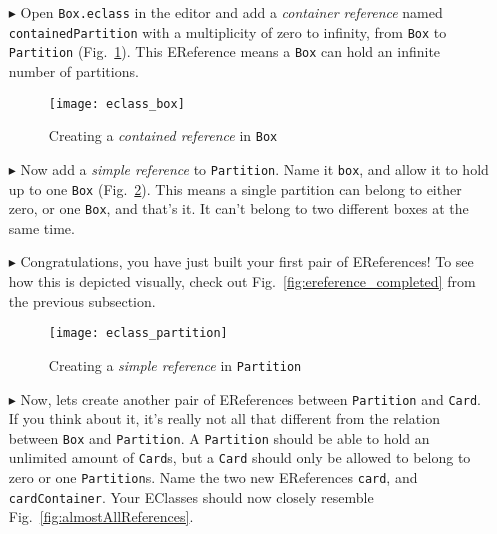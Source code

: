 \begin{itemize}

\item[$\blacktriangleright$] Open \texttt{Box.eclass} in the editor and add a \emph{container reference} named \texttt{containedPartition} with a
multiplicity of zero to infinity, from \texttt{Box} to \texttt{Partition} (Fig.~\ref{fig:cpartitionReference}). This EReference means a \texttt{Box}
can hold an infinite number of partitions.

\vspace{0.5cm}

\begin{figure}[htbp]
	\centering
  \texttt{[image: eclass\_box]}
	\caption{Creating a \emph{contained reference} in \texttt{Box}}
	\label{fig:cpartitionReference}
\end{figure} 

\vspace{0.5cm}

\item[$\blacktriangleright$] Now add a \emph{simple reference} to \texttt{Partition}. Name it \texttt{box}, and allow it to hold up to one \texttt{Box}
(Fig.~\ref{fig:boxReference}). This means a single partition can belong to either zero, or one \texttt{Box}, and that's it. It can't belong to two different
boxes at the same time.

\item[$\blacktriangleright$] Congratulations, you have just built your first pair of EReferences! To see how this is depicted visually, check out
Fig.~\ref{fig:ereference_completed} from the previous subsection.

\newpage

\vspace{0.5cm}

\begin{figure}[htbp]
	\centering
  \texttt{[image: eclass\_partition]}
	\caption{Creating a \emph{simple reference} in \texttt{Partition}}
	\label{fig:boxReference}
\end{figure} 

\vspace{0.5cm}

\item[$\blacktriangleright$] Now, lets create another pair of EReferences between \texttt{Partition} and \texttt{Card}. If you think about it, it's really not
all that different from the relation between \texttt{Box} and \texttt{Partition}. A \texttt{Partition} should be able to hold an unlimited amount of
\texttt{Card}s, but a \texttt{Card} should only be allowed to belong to zero or one \texttt{Partition}s. Name the two new EReferences
\texttt{card}, and \texttt{cardContainer}. Your EClasses should now closely resemble Fig.~\ref{fig:almostAllReferences}.


\end{itemize}
